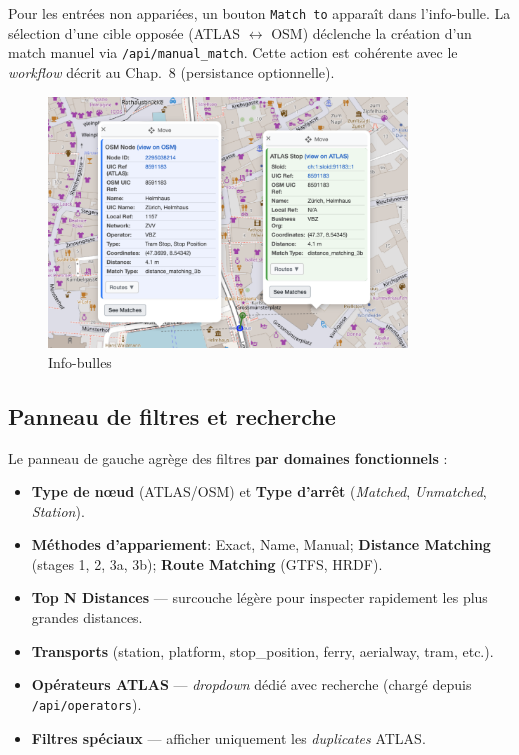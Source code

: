 Pour les entrées non appariées, un bouton \texttt{Match to} apparaît dans l'info-bulle. La sélection d'une cible opposée (ATLAS \(\leftrightarrow\) OSM) déclenche la création d'un match manuel via \texttt{/api/manual\_match}. Cette action est cohérente avec le \textit{workflow} décrit au Chap.~8 (persistance optionnelle).

\begin{figure}[h]
  \centering
  \includegraphics[width=0.85\textwidth]{../figures/chap9/popups.png}
  \caption{Info-bulles}
  \label{fig:frontend-popups}
\end{figure}

\subsection{Panneau de filtres et recherche}
Le panneau de gauche agrège des filtres \textbf{par domaines fonctionnels} :
\begin{itemize}
  \item \textbf{Type de nœud} (ATLAS/OSM) et \textbf{Type d'arrêt} (\textit{Matched}, \textit{Unmatched}, \textit{Station}).
  \item \textbf{Méthodes d'appariement}: Exact, Name, Manual; \textbf{Distance Matching} (stages 1, 2, 3a, 3b); \textbf{Route Matching} (GTFS, HRDF).
  \item \textbf{Top N Distances} — surcouche légère pour inspecter rapidement les plus grandes distances.
  \item \textbf{Transports} (station, platform, stop\_position, ferry, aerialway, tram, etc.).
  \item \textbf{Opérateurs ATLAS} — \textit{dropdown} dédié avec recherche (chargé depuis \texttt{/api/operators}).
  \item \textbf{Filtres spéciaux} — afficher uniquement les \textit{duplicates} ATLAS.
\end{itemize}

